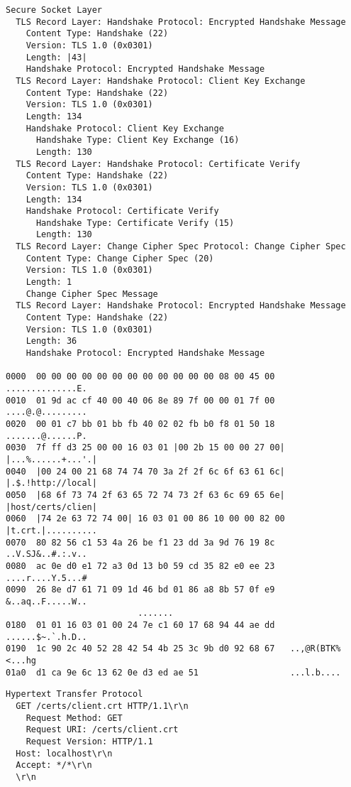 \begin{lstlisting}[caption={Mensagem \tlsHsCu}]
Secure Socket Layer
  TLS Record Layer: Handshake Protocol: Encrypted Handshake Message
    Content Type: Handshake (22)
    Version: TLS 1.0 (0x0301)
    Length: |43|
    Handshake Protocol: Encrypted Handshake Message
  TLS Record Layer: Handshake Protocol: Client Key Exchange
    Content Type: Handshake (22)
    Version: TLS 1.0 (0x0301)
    Length: 134
    Handshake Protocol: Client Key Exchange
      Handshake Type: Client Key Exchange (16)
      Length: 130
  TLS Record Layer: Handshake Protocol: Certificate Verify
    Content Type: Handshake (22)
    Version: TLS 1.0 (0x0301)
    Length: 134
    Handshake Protocol: Certificate Verify
      Handshake Type: Certificate Verify (15)
      Length: 130
  TLS Record Layer: Change Cipher Spec Protocol: Change Cipher Spec
    Content Type: Change Cipher Spec (20)
    Version: TLS 1.0 (0x0301)
    Length: 1
    Change Cipher Spec Message
  TLS Record Layer: Handshake Protocol: Encrypted Handshake Message
    Content Type: Handshake (22)
    Version: TLS 1.0 (0x0301)
    Length: 36
    Handshake Protocol: Encrypted Handshake Message

0000  00 00 00 00 00 00 00 00 00 00 00 00 08 00 45 00   ..............E.
0010  01 9d ac cf 40 00 40 06 8e 89 7f 00 00 01 7f 00   ....@.@.........
0020  00 01 c7 bb 01 bb fb 40 02 02 fb b0 f8 01 50 18   .......@......P.
0030  7f ff d3 25 00 00 16 03 01 |00 2b 15 00 00 27 00|   |...%......+...'.|
0040  |00 24 00 21 68 74 74 70 3a 2f 2f 6c 6f 63 61 6c|   |.$.!http://local|
0050  |68 6f 73 74 2f 63 65 72 74 73 2f 63 6c 69 65 6e|   |host/certs/clien|
0060  |74 2e 63 72 74 00| 16 03 01 00 86 10 00 00 82 00   |t.crt.|..........
0070  80 82 56 c1 53 4a 26 be f1 23 dd 3a 9d 76 19 8c   ..V.SJ&..#.:.v..
0080  ac 0e d0 e1 72 a3 0d 13 b0 59 cd 35 82 e0 ee 23   ....r....Y.5...#
0090  26 8e d7 61 71 09 1d 46 bd 01 86 a8 8b 57 0f e9   &..aq..F.....W..
                          .......
0180  01 01 16 03 01 00 24 7e c1 60 17 68 94 44 ae dd   ......$~.`.h.D..
0190  1c 90 2c 40 52 28 42 54 4b 25 3c 9b d0 92 68 67   ..,@R(BTK%<...hg
01a0  d1 ca 9e 6c 13 62 0e d3 ed ae 51                  ...l.b....
\end{lstlisting}

\begin{lstlisting}[caption={Solicitação HTTP enviada pela aplicação \texttt{s\_server}}]
Hypertext Transfer Protocol
  GET /certs/client.crt HTTP/1.1\r\n
    Request Method: GET
    Request URI: /certs/client.crt
    Request Version: HTTP/1.1
  Host: localhost\r\n
  Accept: */*\r\n
  \r\n
\end{lstlisting}

